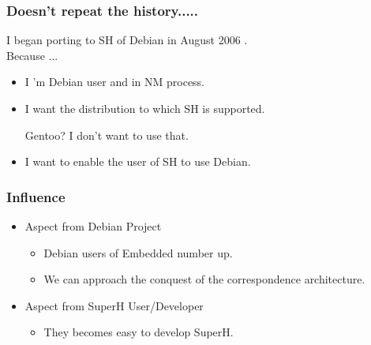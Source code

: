 \documentclass[cjk,dvipdfm,12pt]{beamer}
\begin{document}
\begin{frame}
 \frametitle{Doesn't repeat the history.....}

  I began porting to SH of Debian in August 2006 .\\
  Because ...
  \begin{itemize}
    \item I 'm Debian user and in NM process.
    \item I want the distribution to which SH is supported.

	Gentoo? I don't want to use that.
    \item I want to enable the user of SH to use Debian.
  \end{itemize}
\end{frame}



\begin{frame}
 \frametitle{Influence}
    \begin{itemize}
	\item Aspect from Debian Project
	 \begin{itemize}
	  \item Debian users of Embedded number up.
	  \item We can approach the conquest of the 
		correspondence architecture.%
 
	 \end{itemize} 
	\item Aspect from SuperH User/Developer
	 \begin{itemize}
	  \item They becomes easy to develop SuperH. 
	 \end{itemize}
  \end{itemize}
\end{frame}


%	
%
%
\end{document}
